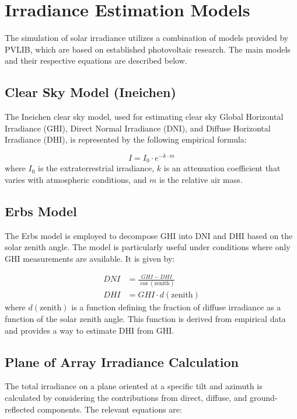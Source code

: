 \section{Irradiance Estimation Models}

The simulation of solar irradiance utilizes a combination of models provided by PVLIB, which are based on established photovoltaic research. The main models and their respective equations are described below.

\subsection{Clear Sky Model (Ineichen)}
The Ineichen clear sky model, used for estimating clear sky Global Horizontal Irradiance (GHI), Direct Normal Irradiance (DNI), and Diffuse Horizontal Irradiance (DHI), is represented by the following empirical formula:

\begin{equation}
I = I_0 \cdot e^{-k \cdot m}
\label{eq:ineichen}
\end{equation}
where \( I_0 \) is the extraterrestrial irradiance, \( k \) is an attenuation coefficient that varies with atmospheric conditions, and \( m \) is the relative air mass.

\subsection{Erbs Model}
The Erbs model is employed to decompose GHI into DNI and DHI based on the solar zenith angle. The model is particularly useful under conditions where only GHI measurements are available. It is given by:

\begin{align}
DNI &= \frac{GHI - DHI}{\cos(\text{zenith})} \\
DHI &= GHI \cdot d(\text{zenith})
\label{eq:erbs}
\end{align}
where \( d(\text{zenith}) \) is a function defining the fraction of diffuse irradiance as a function of the solar zenith angle. This function is derived from empirical data and provides a way to estimate DHI from GHI.

\subsection{Plane of Array Irradiance Calculation}
The total irradiance on a plane oriented at a specific tilt and azimuth is calculated by considering the contributions from direct, diffuse, and ground-reflected components. The relevant equations are:

